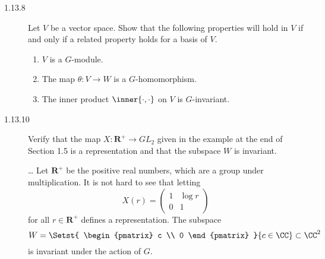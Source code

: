 \documentclass{math174}
\date{Monday, February 11}
\author{}
\begin{document}
\begin{description}
\item[1.13.8] Let \(V\) be a vector space.  Show that the following
  properties will hold in \(V\) if and only if a related property
  holds for a basis of \(V\).
  \begin{enumerate}
  \item \(V\) is a \(G\)-module.
  \item The map \(\theta \colon V \to W\) is a \(G\)-homomorphism.
  \item The inner product \(\inner{\cdot, \cdot}\) on \(V\) is
    \(G\)-invariant.
  \end{enumerate}

  \begin{solution}

  \end{solution}

\item[1.13.10] Verify that the map \(X \colon \mathbf R^+ \to GL_2\)
  given in the example at the end of Section 1.5 is a representation
  and that the subspace \(W\) is invariant.

  \begin{book}
    \dots{} Let \(\mathbf R^+\) be the positive real numbers, which
    are a group under multiplication.  It is not hard to see that
    letting
    \[
      X(r) =
      \begin{pmatrix}
        1 & \log r \\
        0 & 1
      \end{pmatrix}
    \]
    for all \(r \in \mathbf R^+\) defines a representation.  The
    subspace
    \[
      W = \Setst{
        \begin{pmatrix}
          c \\ 0
        \end{pmatrix}
      }{c \in \CC} \subset \CC^2
    \]
    is invariant under the action of \(G\).
  \end{book}

  \begin{solution}

  \end{solution}
\end{description}
\end{document}
